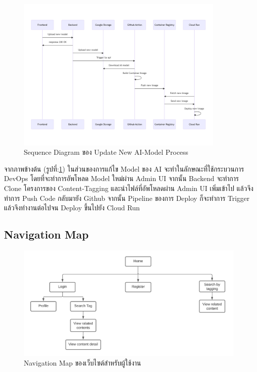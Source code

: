 \documentclass[12pt,oneside,openright,a4paper]{cpe-thai-project}
\begin{document}
\begin{itemize}
  \begin{figure}[!ht]\centering
    \includegraphics[width=0.9\textwidth]{./img/ai_update.png}
    \caption{Sequence Diagram ของ Update New AI-Model Process}\label{fig:ai_update} 
  \end{figure}
  
  \hspace{1cm} จากภาพข้างต้น (รูปที่:\ref{fig:ai_update}) ในส่วนของการแก้ไข Model ของ AI จะทำในลักษณะที่ใช้กระบวนการ DevOps โดยที่จะทำการอัพโหลด Model ใหม่ผ่าน Admin UI 
  จากนั้น Backend จะทำการ Clone โครงการของ Content-Tagging และนำไฟล์ที่อัพโหลดผ่าน Admin UI เพิ่มเข้าไป แล้วจึงทำการ Push Code กลับมายัง Github 
  จากนั้น Pipeline ของการ Deploy ก็จะทำการ Trigger แล้วจึงทำงานต่อไปจน Deploy ขึ้นไปยัง Cloud Run 

\subsection{Navigation Map}
  \begin{figure}[!ht]\centering
    \includegraphics[width=13cm]{./img/nav.png}
    \caption{Navigation Map ของเว็บไซต์สำหรับผู้ใช้งาน}\label{fig:navmap} 
  \end{figure}


\end{itemize}
\end{document}
